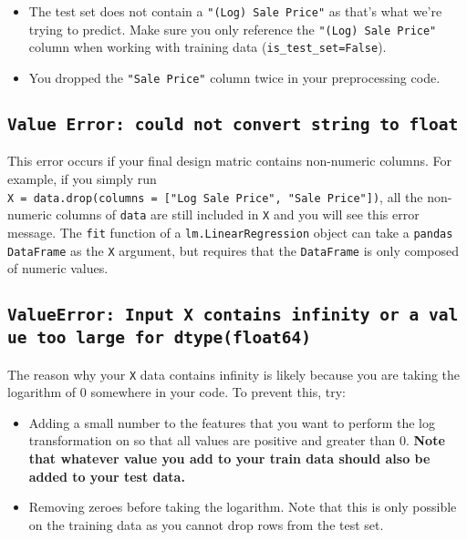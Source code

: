 \documentclass[
  letterpaper,
  DIV=11,
  numbers=noendperiod]{scrreprt}
\providecommand{\tightlist}{%
  \setlength{\itemsep}{0pt}\setlength{\parskip}{0pt}}\usepackage{longtable,booktabs,array}
\begin{document}
\begin{itemize}
\tightlist
\item
  The test set does not contain a \texttt{"(Log)\ Sale\ Price"} as
  that's what we're trying to predict. Make sure you only reference the
  \texttt{"(Log)\ Sale\ Price"} column when working with training data
  (\texttt{is\_test\_set=False}).
\item
  You dropped the \texttt{"Sale\ Price"} column twice in your
  preprocessing code.
\end{itemize}

\subsection{\texorpdfstring{\texttt{Value\ Error:\ could\ not\ convert\ string\ to\ float}}{Value Error: could not convert string to float}}\label{value-error-could-not-convert-string-to-float}

This error occurs if your final design matric contains non-numeric
columns. For example, if you simply run
\texttt{X\ =\ data.drop(columns\ =\ {[}"Log\ Sale\ Price",\ "Sale\ Price"{]})},
all the non-numeric columns of \texttt{data} are still included in
\texttt{X} and you will see this error message. The \texttt{fit}
function of a \texttt{lm.LinearRegression} object can take a
\texttt{pandas} \texttt{DataFrame} as the \texttt{X} argument, but
requires that the \texttt{DataFrame} is only composed of numeric values.

\subsection{\texorpdfstring{\texttt{ValueError:\ Input\ X\ contains\ infinity\ or\ a\ value\ too\ large\ for\ dtype(\textquotesingle{}float64\textquotesingle{})}}{ValueError: Input X contains infinity or a value too large for dtype(\textquotesingle float64\textquotesingle)}}\label{valueerror-input-x-contains-infinity-or-a-value-too-large-for-dtypefloat64}

The reason why your \texttt{X} data contains infinity is likely because
you are taking the logarithm of 0 somewhere in your code. To prevent
this, try:

\begin{itemize}
\tightlist
\item
  Adding a small number to the features that you want to perform the log
  transformation on so that all values are positive and greater than 0.
  \textbf{Note that whatever value you add to your train data should
  also be added to your test data.}
\item
  Removing zeroes before taking the logarithm. Note that this is only
  possible on the training data as you cannot drop rows from the test
  set.
\end{itemize}
\end{document}
